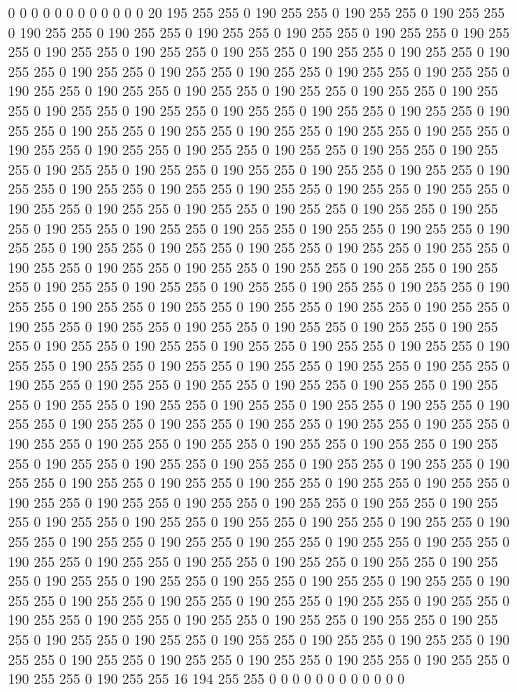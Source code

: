 0 0 0 0 0 0 0 0 0 0 0 0 20 195 255 255 0 190 255 255 0 190 255 255 0 190 255 255 0 190 255 255 0 190 255 255 0 190 255 255 0 190 255 255 0 190 255 255 0 190 255 255 0 190 255 255 0 190 255 255 0 190 255 255 0 190 255 255 0 190 255 255 0 190 255 255 0 190 255 255 0 190 255 255 0 190 255 255 0 190 255 255 0 190 255 255 0 190 255 255 0 190 255 255 0 190 255 255 0 190 255 255 0 190 255 255 0 190 255 255 0 190 255 255 0 190 255 255 0 190 255 255 0 190 255 255 0 190 255 255 0 190 255 255 0 190 255 255 0 190 255 255 0 190 255 255 0 190 255 255 0 190 255 255 0 190 255 255 0 190 255 255 0 190 255 255 0 190 255 255 0 190 255 255 0 190 255 255 0 190 255 255 0 190 255 255 0 190 255 255 
0 190 255 255 0 190 255 255 0 190 255 255 0 190 255 255 0 190 255 255 0 190 255 255 0 190 255 255 0 190 255 255 0 190 255 255 0 190 255 255 0 190 255 255 0 190 255 255 0 190 255 255 0 190 255 255 0 190 255 255 0 190 255 255 0 190 255 255 0 190 255 255 0 190 255 255 0 190 255 255 0 190 255 255 0 190 255 255 0 190 255 255 0 190 255 255 0 190 255 255 0 190 255 255 0 190 255 255 0 190 255 255 0 190 255 255 0 190 255 255 0 190 255 255 0 190 255 255 0 190 255 255 0 190 255 255 0 190 255 255 0 190 255 255 0 190 255 255 0 190 255 255 0 190 255 255 0 190 255 255 0 190 255 255 0 190 255 255 0 190 255 255 0 190 255 255 0 190 255 255 0 190 255 255 0 190 255 255 0 190 255 255 0 190 255 255 0 190 255 255 
0 190 255 255 0 190 255 255 0 190 255 255 0 190 255 255 0 190 255 255 0 190 255 255 0 190 255 255 0 190 255 255 0 190 255 255 0 190 255 255 0 190 255 255 0 190 255 255 0 190 255 255 0 190 255 255 0 190 255 255 0 190 255 255 0 190 255 255 0 190 255 255 0 190 255 255 0 190 255 255 0 190 255 255 0 190 255 255 0 190 255 255 0 190 255 255 0 190 255 255 0 190 255 255 0 190 255 255 0 190 255 255 0 190 255 255 0 190 255 255 0 190 255 255 0 190 255 255 0 190 255 255 0 190 255 255 0 190 255 255 0 190 255 255 0 190 255 255 0 190 255 255 0 190 255 255 0 190 255 255 0 190 255 255 0 190 255 255 0 190 255 255 0 190 255 255 0 190 255 255 0 190 255 255 0 190 255 255 0 190 255 255 0 190 255 255 0 190 255 255 
0 190 255 255 0 190 255 255 0 190 255 255 0 190 255 255 0 190 255 255 0 190 255 255 0 190 255 255 0 190 255 255 0 190 255 255 0 190 255 255 0 190 255 255 0 190 255 255 0 190 255 255 0 190 255 255 0 190 255 255 0 190 255 255 0 190 255 255 0 190 255 255 0 190 255 255 0 190 255 255 0 190 255 255 0 190 255 255 0 190 255 255 0 190 255 255 0 190 255 255 0 190 255 255 0 190 255 255 0 190 255 255 0 190 255 255 0 190 255 255 0 190 255 255 0 190 255 255 0 190 255 255 0 190 255 255 0 190 255 255 0 190 255 255 0 190 255 255 0 190 255 255 0 190 255 255 0 190 255 255 0 190 255 255 0 190 255 255 0 190 255 255 0 190 255 255 0 190 255 255 0 190 255 255 16 194 255 255 0 0 0 0 0 0 0 0 0 0 0 0 
